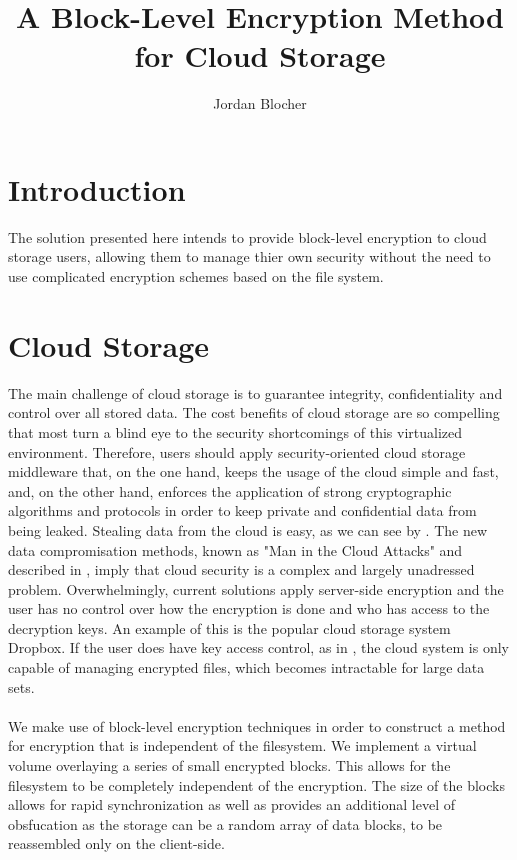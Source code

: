 \documentclass[12pt]{article}
\title{A Block-Level Encryption Method for Cloud Storage}
\author{Jordan Blocher}
\begin{document}
\maketitle

\section{Introduction}
The solution presented here intends to provide block-level encryption to cloud storage users,
allowing them to manage thier own security without the need to use complicated encryption schemes
based on the file system.

\section{Cloud Storage}
The main challenge of cloud storage is to guarantee integrity, confidentiality and
control over all stored data. 
The cost benefits of cloud storage are so compelling that most turn a blind eye to the security 
shortcomings of this virtualized environment.
Therefore, users should apply security-oriented cloud
storage middleware that, on the one hand, keeps the usage of the cloud simple and fast, and,
on the other hand, enforces the application of strong cryptographic algorithms and protocols in
order to keep private and confidential data from being leaked. 
Stealing data from the cloud is easy, as we can see by \cite{mutch10}. The new data compromisation
methods, known as "Man in the Cloud Attacks" and described in \cite{imperva}, imply that cloud security
is a complex and largely unadressed problem.
Overwhelmingly, current solutions
apply server-side encryption and the user has no control over how the encryption is done and
who has access to the decryption keys. An example of this is the popular cloud storage system 
Dropbox. If the user does have key access control, as in \cite{tresorit}, the cloud
system is only capable of managing encrypted files, which becomes intractable for large data
sets. 
~\\~\\
We make use of block-level encryption techniques in order to construct a method for encryption that is independent of the filesystem. We implement a virtual volume overlaying a series of small encrypted blocks. This allows for the filesystem to be completely independent of the encryption. The size of the blocks allows for rapid synchronization as well as provides an additional level of obsfucation as the storage can be a random array of data blocks, to be reassembled only on the client-side. 
\end{document}
